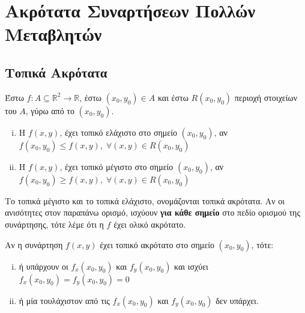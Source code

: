 




\linespread{1.2}

\pagestyle{askhseis}
\usepackage{cutwin}
\everymath{\displaystyle}



\chapter{Ακρότατα Συναρτήσεων Πολλών Μεταβλητών}

\section{Τοπικά Ακρότατα}

\begin{dfn}
\item {}
  Έστω $ f \colon A \subseteq \mathbb{R}^{2} \to \mathbb{R} $, έστω 
  $ (x_{0}, y_{0}) \in A $ και έστω $R(x_{0}, y_{0}) $ περιοχή στοιχείων του $A$, 
  γύρω από το $ (x_{0}, y_{0}) $.
  \begin{enumerate}[i)]
    \item 
      Η $ f(x,y) $, έχει τοπικό ελάχιστο στο σημείο $ (x_{0}, y_{0}) $, αν 
      $ f(x_{0}, y_{0}) \leq f(x,y), \; \forall (x,y) \in R(x_{0}, y_{0}) $ 
    \item 
      Η $ f(x,y) $, έχει τοπικό μέγιστο στο σημείο $ (x_{0}, y_{0}) $, αν 
      $ f(x_{0}, y_{0}) \geq f(x,y), \; \forall (x,y) \in R(x_{0}, y_{0}) $ 
  \end{enumerate}
  Το τοπικά μέγιστο και το τοπικά ελάχιστο, ονομάζονται \textcolor{Col1}{τοπικά
  ακρότατα}. 
  Αν οι ανισότητες στον παραπάνω ορισμό, ισχύουν \textbf{για κάθε σημείο} στο πεδίο 
  ορισμού της συνάρτησης, τότε λέμε ότι η $f$ έχει \textcolor{Col1}{ολικό ακρότατο}.
\end{dfn}

\begin{prop}\label{prop:fermat2}
\item {}
  Αν η συνάρτηση $ f(x,y) $ έχει τοπικό ακρότατο στο σημείο $ (x_{0}, y_{0}) $, 
  τότε:
  \begin{enumerate}[i)]
    \item ή υπάρχουν οι $ f_{x}(x_{0}, y_{0}) $ και $ f_{y}(x_{0}, y_{0}) $ 
      και ισχύει $ f_{x}(x_{0}, y_{0}) = f_{y}(x_{0}, y_{0} )=0 $
    \item ή μία τουλάχιστον από τις $ f_{x}(x_{0}, y_{0}) $ και 
      $ f_{y}(x_{0}, y_{0}) $ δεν υπάρχει.
  \end{enumerate}
\end{prop}

